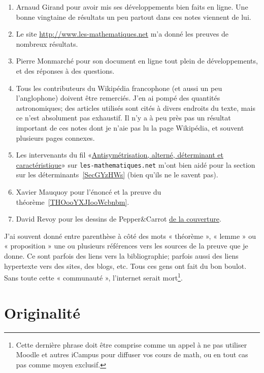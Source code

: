 \begin{enumerate}
    \item
	Arnaud Girand pour avoir mis ses développements bien faits en ligne. Une bonne vingtaine de résultats un peu partout dans ces notes viennent de lui.
    \item
	Le site \url{http://www.les-mathematiques.net} m'a donné les preuves de nombreux résultats.
    \item
	Pierre Monmarché pour son document en ligne tout plein de développements, et des réponses à des questions.
    \item
        Tous les contributeurs du Wikipédia francophone (et aussi un peu l'anglophone) doivent être remerciés. J'en ai pompé des quantités astronomiques; des articles utilisés sont cités à divers endroits du texte, mais ce n'est absolument pas exhaustif. Il n'y a à peu près pas un résultat important de ces notes dont je n'aie pas lu la page Wikipédia, et souvent plusieurs pages connexes.
    \item
        Les intervenants du fil «\href{http://www.les-mathematiques.net/phorum/read.php?2,302266}{Antisymétrisation, alterné, déterminant et caractéristique}» sur \texttt{les-mathematiques.net} m'ont bien aidé pour la section sur les déterminants~\ref{SecGYzHWs} (bien qu'ils ne le savent pas).
    \item
        Xavier Mauquoy pour l'énoncé et la preuve du théorème~\ref{THOooYXJIooWcbnbm}.
    \item
        David Revoy pour les dessins de Pepper\&Carrot \href{https://www.peppercarrot.com/fr/article285/episode-8-pepper-s-birthday-party}{de la couverture}.
\end{enumerate}

J'ai souvent donné entre parenthèse à côté des mots « théorème », « lemme » ou « proposition » une ou plusieurs références vers les sources de la preuve que je donne. Ce sont parfois des liens vers la bibliographie; parfois aussi des liens hypertexte vers des sites, des blogs, etc. Tous ces gens ont fait du bon boulot. Sans toute cette « communauté », l'internet serait mort\footnote{Cette dernière phrase doit être comprise comme un appel à ne pas utiliser Moodle et autres iCampus pour diffuser vos cours de math, ou en tout cas pas comme moyen exclusif.}.

\section{Originalité}


